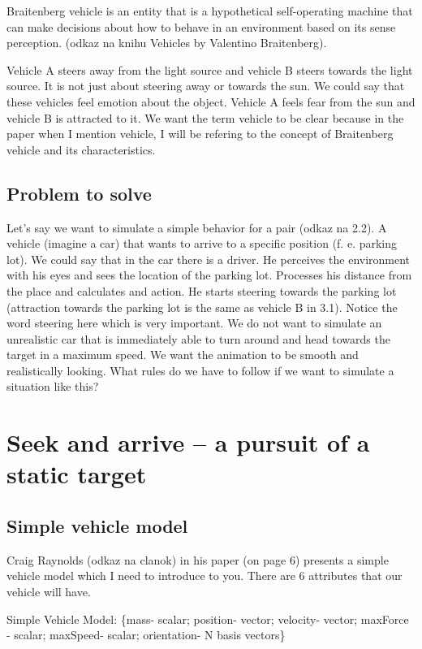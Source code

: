 \documentclass[10pt,twoside,slovak,a4paper]{article}
\begin{document}
Braitenberg vehicle is an entity that is a hypothetical self-operating machine that can make decisions about how to behave in an environment based on its sense perception. (odkaz na knihu Vehicles by Valentino Braitenberg). 

Vehicle A steers away from the light source and vehicle B steers towards the light source. It is not just about steering away or towards the sun. We could say that these vehicles feel emotion about the object. Vehicle A feels fear from the sun and vehicle B is attracted to it. We want the term vehicle to be clear because in the paper when I mention vehicle, I will be refering to the concept of Braitenberg vehicle and its characteristics. 

\subsection{Problem to solve} \label{problem to solve}

Let’s say we want to simulate a simple behavior for a pair (odkaz na 2.2). A vehicle (imagine a car) that wants to arrive to a specific position (f. e. parking lot). We could say that in the car there is a driver. He perceives the environment with his eyes and sees the location of the parking lot. Processes his distance from the place and calculates and action. He starts steering towards the parking lot (attraction towards the parking lot is the same as vehicle B in 3.1). Notice the word steering here which is very important. We do not want to simulate an unrealistic car that is immediately able to turn around and head towards the target in a maximum speed. We want the animation to be smooth and realistically looking. What rules do we have to follow if we want to simulate a situation like this?


\section{Seek and arrive – a pursuit of a static target} \label{seek and arrive}

\subsection{Simple vehicle model} \label{model}
Craig Raynolds (odkaz na clanok) in his paper (on page 6) presents a simple vehicle model which I need to introduce to you. There are 6 attributes that our vehicle will have. 

Simple Vehicle Model: \{mass- scalar; position- vector; velocity-	vector; maxForce - scalar; maxSpeed- scalar; orientation- N basis vectors\}
\end{document}
